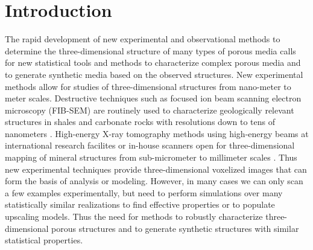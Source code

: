 \documentclass[aps,pre,twocolumn,letterpaper,floatfix,showpacs]{revtex4}
\begin{document}
\section{Introduction}

The rapid development of new experimental and observational methods to determine the three-dimensional structure of many types of porous media calls for new statistical tools and methods to characterize complex porous media and to generate synthetic media based on the observed structures.
New experimental methods allow for studies of three-dimensional structures from nano-meter to meter scales.
Destructive techniques such as focused ion beam scanning electron microscopy (FIB-SEM) are routinely used to characterize geologically relevant structures in shales and carbonate rocks with resolutions down to tens of nanometers \cite{cnudde2013high,curtis2010structural}.
High-energy X-ray tomography methods using high-energy beams at international research facilites or in-house scanners open for three-dimensional mapping of mineral structures from sub-micrometer to millimeter scales \cite{kobchenko20114d,jamtveit2014pore,zhu2011microtomography,fusseis2009creep}.
Thus new experimental techniques provide three-dimensional voxelized images that can form the basis of analysis or modeling.
However, in many cases we can only scan a few examples experimentally, but need to perform simulations over many statistically similar realizations to find effective properties or to populate upscaling models.
Thus the need for methods to robustly characterize three-dimensional porous structures and to generate synthetic structures with similar statistical properties. 
\end{document}
